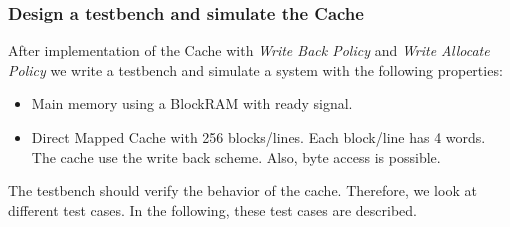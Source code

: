 \subsubsection{Design a testbench and simulate the Cache}
After implementation of the Cache with \textit{Write Back Policy} and \textit{Write Allocate Policy} we write a testbench and simulate a system with the following properties:
\begin{itemize} 
	\item Main memory using a BlockRAM with ready signal.
	\item Direct Mapped Cache with 256 blocks/lines. Each block/line has 4 words. The cache use the write back scheme. Also, byte access is possible.	
\end{itemize}
The testbench should verify the behavior of the cache. Therefore, we look at different test cases. In the following, these test cases are described.
